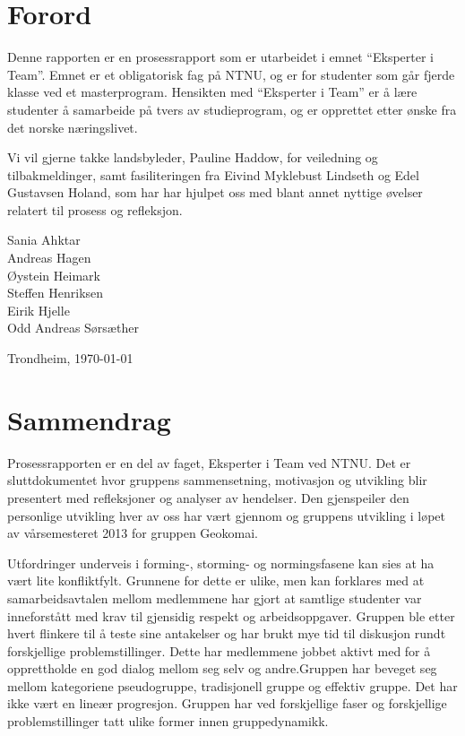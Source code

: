 \documentclass[a4paper,norsk,oneside]{article}
\newcommand{\thesisAuthor}{Sania Ahktar\\Andreas Hagen\\Øystein Heimark\\Steffen Henriksen\\Eirik Hjelle\\Odd Andreas Sørsæther}
\begin{document}
\section*{Forord}



\vspace{1cm}

Denne rapporten er en prosessrapport som er utarbeidet i emnet “Eksperter i Team”. Emnet er et obligatorisk fag på NTNU, og er for studenter som går fjerde klasse ved et masterprogram. Hensikten med “Eksperter i Team” er å lære studenter å samarbeide på tvers av studieprogram, og er opprettet etter ønske fra det norske næringslivet.

Vi vil gjerne takke landsbyleder, Pauline Haddow, for veiledning og tilbakmeldinger, samt fasiliteringen fra Eivind Myklebust Lindseth og Edel Gustavsen Holand, som har har hjulpet oss med blant annet nyttige øvelser relatert til prosess og refleksjon. 





\vfill

\noindent
\thesisAuthor

\hfill Trondheim, \today
\cleardoublepage

\section*{Sammendrag} 
Prosessrapporten er en del av faget, Eksperter i Team ved NTNU. Det er sluttdokumentet hvor gruppens sammensetning, motivasjon og utvikling blir presentert med refleksjoner og analyser av hendelser. Den gjenspeiler den personlige utvikling hver av oss har vært gjennom og gruppens utvikling i løpet av vårsemesteret 2013 for gruppen Geokomai. 

Utfordringer underveis i forming-, storming- og normingsfasene kan sies at ha vært lite konfliktfylt. Grunnene for dette er ulike, men kan forklares med at samarbeidsavtalen mellom medlemmene har gjort at samtlige studenter var inneforstått med krav til gjensidig respekt og arbeidsoppgaver. Gruppen ble etter hvert flinkere til å teste sine antakelser og har brukt mye tid til diskusjon rundt forskjellige problemstillinger. Dette har medlemmene jobbet aktivt med for å opprettholde en god dialog mellom seg selv og andre.Gruppen har beveget seg mellom kategoriene pseudogruppe, tradisjonell gruppe og effektiv gruppe. Det har ikke vært en lineær progresjon. Gruppen har ved forskjellige faser og forskjellige problemstillinger tatt ulike former innen gruppedynamikk. 
\end{document}
